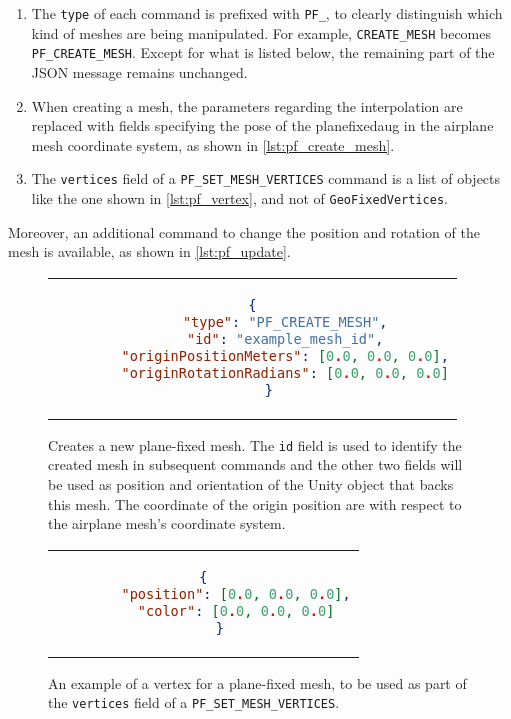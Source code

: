 \begin{enumerate}
    \item The \texttt{type} of each command is prefixed with \texttt{PF\_}, to clearly distinguish which kind of meshes are being manipulated. For example, \texttt{CREATE\_MESH} becomes \texttt{PF\_CREATE\_MESH}. Except for what is listed below, the remaining part of the JSON message remains unchanged.
    \item When creating a mesh, the parameters regarding the interpolation are replaced with fields specifying the pose of the \gls{planefixedaug} in the airplane mesh coordinate system, as shown in \autoref{lst:pf_create_mesh}.
    \item The \texttt{vertices} field of a \texttt{PF\_SET\_MESH\_VERTICES} command is a list of objects like the one shown in \autoref{lst:pf_vertex}, and not of \texttt{GeoFixedVertices}.
\end{enumerate}

Moreover, an additional command to change the position and rotation of the mesh is available, as shown in \autoref{lst:pf_update}.

\begin{figure}
  \centering
  \begin{tabular}{c}
  \begin{lstlisting}[language=json]
    {
        "type": "PF_CREATE_MESH",
        "id": "example_mesh_id",
        "originPositionMeters": [0.0, 0.0, 0.0],
        "originRotationRadians": [0.0, 0.0, 0.0]
    }
  \end{lstlisting}
  \end{tabular}
  \caption{Creates a new plane-fixed mesh. The \texttt{id} field is used to identify the created mesh in subsequent commands and the other two fields will be used as position and orientation of the Unity object that backs this mesh. The coordinate of the origin position are with respect to the airplane mesh's coordinate system.}\label{lst:pf_create_mesh}
\end{figure}

\begin{figure}
  \centering
  \begin{tabular}{c}
  \begin{lstlisting}[language=json]
    {
        "position": [0.0, 0.0, 0.0],
        "color": [0.0, 0.0, 0.0]
    }
  \end{lstlisting}
  \end{tabular}
  \caption{An example of a vertex for a plane-fixed mesh, to be used as part of the \texttt{vertices} field of a \texttt{PF\_SET\_MESH\_VERTICES}.}\label{lst:pf_vertex}
\end{figure}

